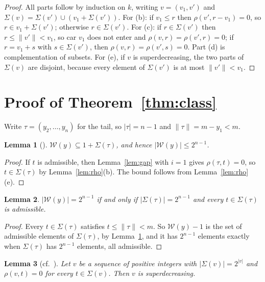 \documentclass[11pt]{article}
\newtheorem{lemma}{Lemma}
\theoremstyle{remark}
\newcommand{\W}{\mathcal W}
\newcommand{\Sub}{\Sigma}
\begin{document}
\begin{proof}
All parts follow by induction on $k$, writing $v=(v_1,v')$ and
$\Sub(v)=\Sub(v')\cup(v_1+\Sub(v'))$. For (b): if $v_1\le r$ then
$\rho(v',r-v_1)=0$, so $r\in v_1+\Sub(v')$; otherwise $r\in\Sub(v')$. For (c):
if $r\in\Sub(v')$ then $r\le\|v'\|<v_1$, so car $v_1$ does not enter and
$\rho(v,r)=\rho(v',r)=0$; if $r=v_1+s$ with $s\in\Sub(v')$, then
$\rho(v,r)=\rho(v',s)=0$. Part (d) is complementation of subsets. For (e), if
$v$ is superdecreasing, the two parts of $\Sub(v)$ are disjoint, because every
element of $\Sub(v')$ is at most $\|v'\|<v_1$.
\end{proof}

\section{Proof of Theorem~\ref{thm:class}}\label{sec:class}

Write $\tau=(y_2,\dots,y_n)$ for the tail, so $|\tau|=n-1$ and
$\|\tau\|=m-y_1<m$.

\begin{lemma}[{\cite[Lemma~4.4 and Theorem~E(b)]{chen}}]\label{lem:bound}
$\W(y)\subseteq1+\Sub(\tau)$, and hence $|\W(y)|\le2^{n-1}$.
\end{lemma}

\begin{proof}
If $t$ is admissible, then Lemma~\ref{lem:gap} with $i=1$ gives
$\rho(\tau,t)=0$, so $t\in\Sub(\tau)$ by Lemma~\ref{lem:rho}(b). The bound
follows from Lemma~\ref{lem:rho}(e).
\end{proof}

\begin{lemma}\label{lem:criterion}
$|\W(y)|=2^{n-1}$ if and only if $|\Sub(\tau)|=2^{n-1}$ and every
$t\in\Sub(\tau)$ is admissible.
\end{lemma}

\begin{proof}
Every $t\in\Sub(\tau)$ satisfies $t\le\|\tau\|<m$. So $\W(y)-1$ is the set of
admissible elements of $\Sub(\tau)$, by Lemma~\ref{lem:bound}, and it has
$2^{n-1}$ elements exactly when $\Sub(\tau)$ has $2^{n-1}$ elements, all
admissible.
\end{proof}

\begin{lemma}[cf.~{\cite[proof of Theorem~E(d)]{chen}}]\label{lem:dom}
Let $v$ be a sequence of positive integers with $|\Sub(v)|=2^{|v|}$ and
$\rho(v,t)=0$ for every $t\in\Sub(v)$. Then $v$ is superdecreasing.
\end{lemma}
\end{document}
